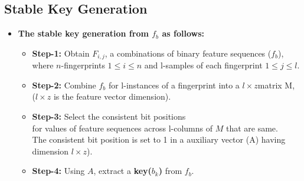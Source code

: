 \subsection{Stable Key Generation}
\begin{frame}[t]{\subsecname}
	\topline
    \begin{itemize}
    	\item \textcolor{navy_theme}{\textbf{The stable key generation from $f_b$ as follows:}}
    	\vspace{0.5em}
    	\begin{itemize}
    	    \setlength\itemsep{0.5em}
        	\item \textbf{Step-1:} Obtain ${F_{i,j}}$, a combinations of binary feature
        	      sequences ($f_{b}$), \\
        		  where $n$-fingerprints $1 \leq i \leq n $ and l-samples of each fingerprint $1 \leq j \leq l $.
        	\item \textbf{Step-2:} Combine $f_{b}$ for l-instances of a fingerprint into a $l\times z$matrix M, \\
        		  ($l\times z$ is the feature vector dimension).
        	\item \textbf{Step-3:} Select the consistent bit positions \\
        		  for values of feature sequences across l-columns of $M$ that are same. \\
        		  The consistent bit position is set to 1 in a auxiliary vector (A) having dimension $l\times z$).
        	\item \textbf{Step-4:} Using $A$, extract a \textbf{key($b_{k}$)} from $f_{b}$.
        \end{itemize}
	\end{itemize}
\end{frame}


